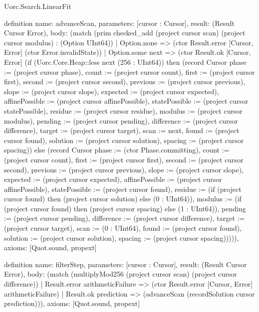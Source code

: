 \begin{lexlean}{Uorc.Search.LinearFit}
\begin{semanticmodule}
definition{
  name: advanceScan,
  parameters: [cursor : Cursor],
  result: (Result Cursor Error),
  body: (match (prim checked_add (project cursor scan) (project cursor modulus) : (Option UInt64))
    | Option.none => (ctor Result.error [Cursor, Error] (ctor Error.invalidState))
    | Option.some next => (ctor Result.ok [Cursor, Error] (if (Uorc.Core.Heap::less next (256 : UInt64)) then (record Cursor {phase := (project cursor phase), count := (project cursor count), first := (project cursor first), second := (project cursor second), previous := (project cursor previous), slope := (project cursor slope), expected := (project cursor expected), affinePossible := (project cursor affinePossible), statePossible := (project cursor statePossible), residue := (project cursor residue), modulus := (project cursor modulus), pending := (project cursor pending), difference := (project cursor difference), target := (project cursor target), scan := next, found := (project cursor found), solution := (project cursor solution), spacing := (project cursor spacing)}) else (record Cursor {phase := (ctor Phase.committing), count := (project cursor count), first := (project cursor first), second := (project cursor second), previous := (project cursor previous), slope := (project cursor slope), expected := (project cursor expected), affinePossible := (project cursor affinePossible), statePossible := (project cursor found), residue := (if (project cursor found) then (project cursor solution) else (0 : UInt64)), modulus := (if (project cursor found) then (project cursor spacing) else (1 : UInt64)), pending := (project cursor pending), difference := (project cursor difference), target := (project cursor target), scan := (0 : UInt64), found := (project cursor found), solution := (project cursor solution), spacing := (project cursor spacing)})))),
  axioms: [Quot.sound, propext]
}

definition{
  name: filterStep,
  parameters: [cursor : Cursor],
  result: (Result Cursor Error),
  body: (match (multiplyMod256 (project cursor scan) (project cursor difference))
    | Result.error arithmeticFailure => (ctor Result.error [Cursor, Error] arithmeticFailure)
    | Result.ok prediction => (advanceScan (recordSolution cursor prediction))),
  axioms: [Quot.sound, propext]
}


\end{semanticmodule}
\end{lexlean}
